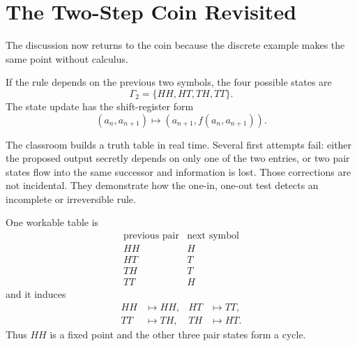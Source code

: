 \section{The Two-Step Coin Revisited}

The discussion now returns to the coin because the discrete example makes the
same point without calculus.

\begin{classroomqa}

\end{classroomqa}

If the rule depends on the previous two symbols, the four possible states are
\begin{equation}
 \Gamma_2=\{HH,HT,TH,TT\}.
\end{equation}
The state update has the shift-register form
\begin{equation}
 (a_n,a_{n+1})\longmapsto
 (a_{n+1},f(a_n,a_{n+1})).
 \label{eq:pair-update}
\end{equation}

The classroom builds a truth table in real time. Several first attempts fail: either the proposed output secretly depends on only one of the two entries, or two pair states flow into the same successor and information is lost. Those corrections are not incidental. They demonstrate how the one-in, one-out test detects an incomplete or irreversible rule.

One workable table is
\begin{equation}
\begin{array}{c|c}
\text{previous pair}&\text{next symbol}\\ \hline
HH&H\\
HT&T\\
TH&T\\
TT&H
\end{array}
\label{eq:xor-table}
\end{equation}
and it induces
\begin{equation}
 \begin{aligned}
 HH&\mapsto HH, & HT&\mapsto TT,\\
 TT&\mapsto TH, & TH&\mapsto HT.
 \end{aligned}
 \label{eq:pair-cycle}
\end{equation}
Thus \(HH\) is a fixed point and the other three pair states form a cycle.

